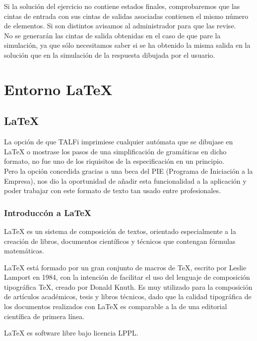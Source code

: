 \documentclass[12pt,a4paper,spanish]{book}
\begin{document}
Si la soluci\'on del ejercicio no contiene estados finales, comprobaremos que las cintas de entrada con sus cintas de salidas asociadas contienen el mismo n\'umero de elementos. Si son distintos avisamos al administrador para que las revise.\\
No se generar\'an las cintas de salida obtenidas en el caso de que pare la simulaci\'on, ya que s\'olo necesitamos saber si se ha obtenido la misma salida en la soluci\'on que en la simulaci\'on de la respuesta dibujada por el usuario.


\chapter{Entorno \LaTeX{}}
\section{\LaTeX{}}
\label{sec:latex}
La opci\'on de que TALFi imprimiese cualquier aut\'omata que se dibujase en {\LaTeX{}} o mostrase los pasos de una simplificaci\'on de gram\'aticas en dicho formato, no fue uno de los riquisitos de la especificaci\'on en un principio.\\
Pero la opci\'on concedida gracias a una beca del PIE (Programa de Iniciaci\'on a la Empresa), nos dio la oportunidad de a\~nadir esta funcionalidad a la aplicaci\'on y poder trabajar con este formato de texto tan usado entre profesionales.\\
\subsection{Introducc\'on a \LaTeX{}}
\LaTeX{} es un sistema de composici\'on de textos, orientado especialmente a la creaci\'on de libros, documentos cient\'ificos y t\'ecnicos que contengan f\'ormulas matem\'aticas.

\LaTeX{} est\'a formado por un gran conjunto de macros de \TeX{}, escrito por Leslie Lamport en 1984, con la intenci\'on de facilitar el uso del lenguaje de composici\'on tipogr\'afica \TeX{}, creado por Donald Knuth. Es muy utilizado para la composici\'on de art\'iculos acad\'emicos, tesis y libros t\'ecnicos, dado que la calidad tipogr\'afica de los documentos realizados con \LaTeX{} es comparable a la de una editorial cient\'ifica de primera l\'inea.

\LaTeX{} es software libre bajo licencia LPPL.
\end{document}

